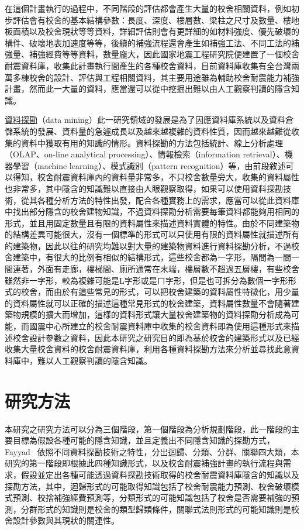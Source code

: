 在這個計畫執行的過程中，不同階段的評估都會產生大量的校舍相關資料，例如初步評估會有校舍的基本結構參數：長度、深度、樓層數、梁柱之尺寸及數量、樓地板面積以及校舍現狀等等資料，詳細評估則會有更詳細的如材料強度、優先破壞的構件、破壞地表加速度等等，後續的補強流程還會產生如補強工法、不同工法的補強量、補強經費等等資料，數量龐大，因此國家地震工程研究院便建置了一個校舍耐震資料庫，收集此計畫執行間產生的各種校舍資料，目前資料庫收集有全台灣兩萬多棟校舍的設計、評估與工程相關資料，其主要用途雖為輔助校舍耐震能力補強計畫，然而此一大量的資料，應當還可以從中挖掘出難以由人工觀察判讀的隱含知識。

\underline{資料探勘}（data mining）此一研究領域的發展是為了因應資料庫系統以及資料倉儲系統的發展、資料量的急遽成長以及越來越複雜的資料性質，因而越來越難從收集的資料中獲取有用的知識的情形。資料探勘的方法包括統計、線上分析處理（OLAP、on-line analytical processing）、情報檢索（information retrieval）、機器學習（machine learning）、模式識別（pattern recognition）等，由前段敘述可以得知，校舍耐震資料庫內的資料量非常多，不只校舍數量旁大，收集的資料屬性也非常多，其中隱含的知識難以直接由人眼觀察取得，如果可以使用資料探勘技術，從其各種分析方法的特性出發，配合各種實務上的需求，應當可以從此資料庫中找出部分隱含的校舍建物知識，不過資料探勘分析需要每筆資料都能夠用相同的形式，並且用固定數量且有限的資料屬性來描述資料實體的特性。由於不同建築物的結構差異可能很大，沒有一個標準的形式可以只使用有限的資料屬性就描述所有的建築物，因此以往的研究均難以對大量的建築物資料進行資料探勘分析，不過校舍建築中，有很大的比例有相似的結構形式，這些校舍都為一字形，隔間為一間一間連著，外面有走廊，樓梯間、廁所通常在末端，樓層數不超過五層樓，有些校舍雖然非一字形，較為複雜可能是L字形或是ㄇ字形，但是也可拆分為數個一字形形式的校舍，而由於有這些常見的形式，可以把校舍建築的資料屬性特徵化，用少量的資料屬性就可以正確的描述這種常見形式的校舍建築，資料屬性數量不會隨著建築物規模的擴大而增加，這樣的資料形式讓大量校舍建築物的資料探勘分析成為可能，而國震中心所建立的校舍耐震資料庫中收集的校舍資料即為使用這種形式來描述校舍設計參數之資料，因此本研究之研究目的即為基於校舍的建築形式以及已經收集大量校舍資料的校舍耐震資料庫，利用各種資料探勘方法來分析並尋找此意資料庫中，難以人工觀察判讀的隱含知識。

\section{研究方法}

本研究之研究方法可以分為三個階段，第一個階段為分析規劃階段，此一階段的主要目標為假設各種可能的隱含知識，並且定義出不同隱含知識的探勘方式，Fayyad~\cite{fayyad1996data} 依照不同資料探勘技術之特性，分出迴歸、分類、分群、關聯四大類，本研究的第一階段即根據此四種知識形式，以及校舍耐震補強計畫的執行流程與需求，假設並定出各種可能透過資料探勘技術取得的校舍耐震資料庫隱含的知識以及探勘方法，其中，迴歸形式的可能取得知識包括了校舍耐震能力預測、校舍破壞模式預測、校捨補強經費預測等，分類形式的可能知識包括了校舍是否需要補強的預測，分群形式的知識則是校舍的類型歸類條件，關聯式法則形式的可能知識則是校舍設計參數與其現狀的關連性。

